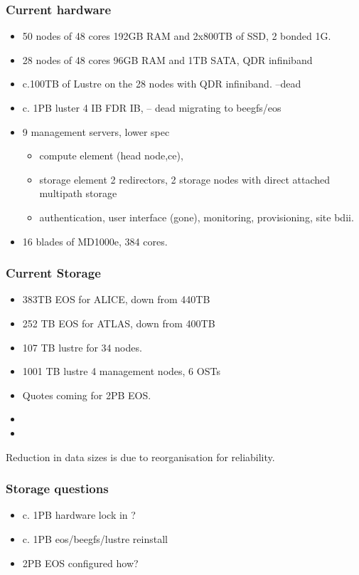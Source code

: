 \documentclass{beamer}
\begin{document}
\begin{frame}
  \frametitle{Current hardware}
  \begin{itemize}
    \item 50 nodes of 48 cores 192GB RAM and 2x800TB of SSD, 2 bonded 1G.
    \item 28 nodes of 48 cores 96GB RAM and 1TB SATA, QDR infiniband
    \item c.100TB of Lustre on the 28 nodes with QDR infiniband. --dead
    \item c. 1PB luster 4 IB FDR IB, -- dead migrating to beegfs/eos
    \item 9 management servers, lower spec
  \begin{itemize}
    \item compute element (head node,ce),
    \item storage element 2 redirectors, 2 storage nodes with direct attached multipath storage
    \item authentication, user interface (gone), monitoring, provisioning, site bdii.
  \end{itemize} 
    \item 16 blades of MD1000e, 384 cores. \color{red}{\bf IB connection}
  \end{itemize}
\end{frame}

\begin{frame}
  \frametitle{Current Storage}
  \begin{itemize}
    \item 383TB EOS for ALICE, down from 440TB
    \item 252 TB EOS for ATLAS, down from 400TB
    \item 107 TB lustre for 34 nodes.
    \item 1001 TB lustre 4 management nodes, 6 OSTs
    \item Quotes coming for 2PB EOS.
    \item \color{red}{400TB ALICE}
    \item \color{red}{400TB ATLAS}
  \end{itemize}
Reduction in data sizes is due to reorganisation for reliability.
\end{frame}


\begin{frame}
\frametitle{Storage questions}
    \begin{itemize}
        \item c. 1PB hardware lock in ?
        \item c. 1PB eos/beegfs/lustre reinstall
        \item 2PB EOS configured how?
    \end{itemize}
\end{frame}
\end{document}
